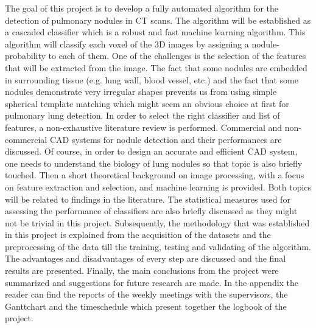 The goal of this project is to develop a fully automated algorithm for the
detection of pulmonary nodules in CT scans. The algorithm will be established as
a cascaded classifier which is a robust and fast machine learning algorithm.
This algorithm will classify each voxel of the 3D images by assigning a
nodule-probability to each of them. One of the challenges is the selection of
the features that will be extracted from the image. The fact that some nodules
are embedded in surrounding tissue (e.g.
lung wall, blood vessel, etc.) and the fact that some nodules demonstrate very
irregular shapes prevents us from using simple spherical template matching which
might seem an obvious choice at first for pulmonary lung detection. In order to
select the right classifier and list of features, a non-exhaustive literature
review is performed. Commercial and non-commercial CAD systems for nodule
detection and their performances are discussed. Of course, in order to design an
accurate and efficient CAD system, one needs to understand the biology of lung
nodules so that topic is also briefly touched. Then a short theoretical
background on image processing, with a focus on feature extraction and
selection, and machine learning is provided. Both topics will be related to
findings in the literature. The statistical measures used for assessing the
performance of classifiers are also briefly discussed as they might not be
trivial in this project. Subsequently, the methodology that was established in
this project is explained from the acquisition of the datasets and the
preprocessing of the data till the training, testing and validating of the
algorithm. The advantages and disadvantages of every step are discussed and the
final results are presented. Finally, the main conclusions from the project were
summarized and suggestions for future research are made. In the appendix the
reader can find the reports of the weekly meetings with the supervisors, the
Ganttchart and the timeschedule which present together the logbook of the
project.







